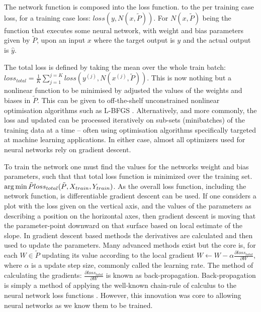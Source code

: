 \documentclass[12pt,parskip]{komatufte}
\begin{document}
The network function is composed into the loss function.
to the per training case loss, for a training case loss: $loss(y, N(x,\tilde{P}))$.
For $N(x,\tilde{P})$ being the function that executes some neural network, with weight and bias parameters given by $\tilde{P}$, upon an input $x$ where the target output is $y$ and the actual output is $\hat{y}$.

The total loss is defined by taking the mean over the whole train batch:
$loss_{total} = \frac{1}{K}\sum_{j=1}^{j=K} loss(y^{(j)}, N(x^{(j)},\tilde{P}))$.
This is now nothing but a nonlinear function to be minimised by adjusted the values of the weights and biases in $\tilde{P}$.
This can be given to off-the-shelf  unconstrained nonlinear optimisation algorithms  such as L-BFGS  \parencite{nocedal1980updating}.
Alternatively, and more commonly, the loss and updated can be processed iteratively on sub-sets (minibatches) of the training data at a time -- often using optimisation algorithms specifically targeted at machine learning applications.
In either case, almost all optimizers used for neural networks rely on gradient descent.



To train the network one must find the values for the networks weight and bias parameters, such that that total loss function is minimized over the training set.
$\operatorname*{arg\,min}{\tilde{P}} loss_{total}(\tilde{P}, X_{train}, Y_{train})$.
As the overall loss function, including the network function, is differentiable
gradient descent can be used.
If one considers a plot with the loss given on the vertical axis,
and the values of the parameters as describing a position on the horizontal axes,
then gradient descent is moving that the parameter-point downward on that surface based on local estimate of the slope.
In gradient descent based methods the derivatives are calculated and then used to update the parameters.
Many advanced methods exist but the core is, for each $W \in \tilde{P}$ updating its value according to the local gradient
$W \leftarrow W - \alpha \frac{\partial loss_{total}}{\partial{W}}$, where $\alpha$ is a update step size, commonly called the learning rate.
The method of calculating the gradients: $\frac{\partial loss_{total}}{\partial{W}}$
is known as back-propagation.
Back-propagation is simply a method of applying the well-known chain-rule of calculus to the neural network loss functions .
However, this innovation was core to allowing neural networks as we know them to be trained.
\end{document}
